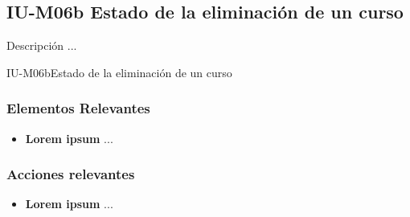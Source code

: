 
\subsection{IU-M06b Estado de la eliminación de un curso}

 Descripción ...

        {IU-M06b}{Estado de la eliminación de un curso}

\subsubsection{Elementos Relevantes}

    \begin{itemize}
    \item {\bf Lorem ipsum}
        ...
    \end{itemize}

\subsubsection{Acciones relevantes}

    \begin{itemize}
    \item {\bf Lorem ipsum}
        ...
    \end{itemize}

\clearpage
